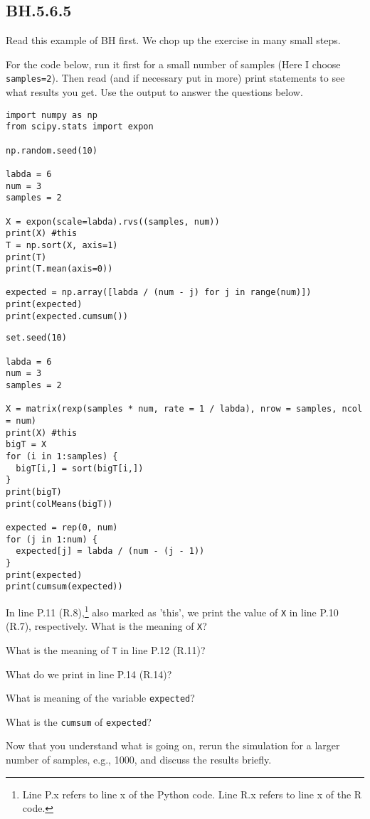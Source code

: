 \subsection{BH.5.6.5}
Read this example of BH first.
We chop up the exercise in many small steps.


For the code below, run it first for a small number of samples (Here I choose \texttt{samples=2}). Then read (and if necessary put in more) print statements to see what results you get.  Use the output to answer the questions below.

\begin{verbatim}
import numpy as np
from scipy.stats import expon

np.random.seed(10)

labda = 6
num = 3
samples = 2

X = expon(scale=labda).rvs((samples, num))
print(X) #this
T = np.sort(X, axis=1)
print(T)
print(T.mean(axis=0))

expected = np.array([labda / (num - j) for j in range(num)])
print(expected)
print(expected.cumsum())
\end{verbatim}


\begin{verbatim}
set.seed(10)

labda = 6
num = 3
samples = 2

X = matrix(rexp(samples * num, rate = 1 / labda), nrow = samples, ncol = num)
print(X) #this
bigT = X
for (i in 1:samples) {
  bigT[i,] = sort(bigT[i,])
}
print(bigT)
print(colMeans(bigT))

expected = rep(0, num)
for (j in 1:num) {
  expected[j] = labda / (num - (j - 1))
}
print(expected)
print(cumsum(expected))
\end{verbatim}



\begin{exercise}
In line P.11 (R.8),\footnote{Line P.x refers to line x of the Python code.
  Line R.x refers to line x of the R code.}
also marked as 'this', we print the value of \texttt{X} in line P.10 (R.7), respectively.
What is the meaning of \texttt{X}?
\end{exercise}

\begin{exercise}
What is the meaning of \texttt{T} in line P.12 (R.11)?
\end{exercise}


\begin{exercise}
What do we print in line P.14 (R.14)?
\end{exercise}

\begin{exercise}
What is meaning of the variable \texttt{expected}?
\end{exercise}

\begin{exercise}
 What is the \texttt{cumsum} of \texttt{expected}?
\end{exercise}

\begin{exercise}
 Now that you understand what is going on, rerun the simulation for a larger number of samples, e.g., 1000, and discuss the results briefly.
\end{exercise}
